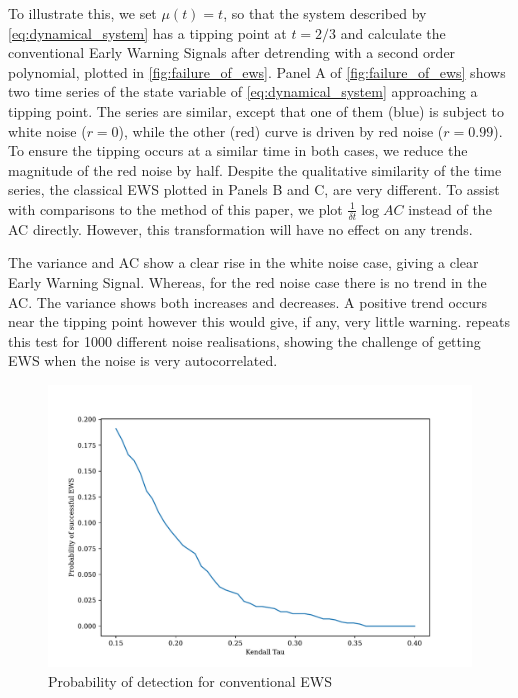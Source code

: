 To illustrate this, we set $\mu(t) = t$, so that the system described by \cref{eq:dynamical_system} has
a tipping point at $t=2/3$ and calculate the conventional Early 
Warning Signals after detrending with a second order polynomial, plotted in \cref{fig:failure_of_ews}.
Panel A of \cref{fig:failure_of_ews} shows two time series of the 
state variable of \cref{eq:dynamical_system} approaching a tipping point.
The series are similar, except that one of them (blue) is subject to white noise ($r = 0$), 
while the other (red) curve is driven by red noise ($r = 0.99$). To
ensure the tipping occurs at a similar time in both
cases, we reduce the magnitude of the red noise by half.
Despite the qualitative similarity of the time series,
the classical EWS plotted in Panels B and C, are very different. To assist with comparisons to the method of this paper, we
plot $\frac{1}{\delta t}\log AC$ instead of the AC directly. However, this
transformation will have no effect on any trends.

The variance and AC show a clear rise in
the white noise case, giving a clear Early Warning Signal. 
Whereas, for the red noise case there is no trend in the AC. The 
variance shows both increases and decreases. A positive trend occurs near
the tipping point however this would give, if any, very little warning. 
repeats this test for 1000 different noise realisations, showing the
challenge of getting EWS when the noise is very 
autocorrelated.

\begin{figure}
  \centering
  \includegraphics[width=\textwidth]{pofsuccess}
  \caption[Probability of detection for conventional EWS]{Probability of detection for conventional EWS}
  \label{fig:prob_of_suc}
\end{figure}

